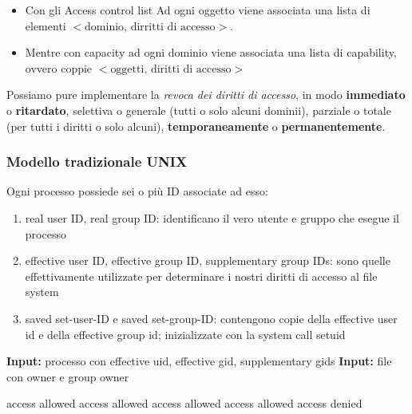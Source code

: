 \documentclass[a4paper,12pt]{article}
\begin{document}
\begin{itemize}
  \item Con gli Access control list Ad ogni oggetto viene associata una lista di elementi $<\text{dominio}, \, \text{dirritti di accesso}>$.\\
  \item Mentre con capacity ad ogni dominio viene associata una lista di capability, ovvero coppie $<\text{oggetti}, \, \text{diritti di accesso}>$
\end{itemize}
Possiamo pure implementare la \textit{revoca dei diritti di accesso}, in modo \textbf{immediato} o \textbf{ritardato}, selettiva o generale (tutti o solo alcuni dominii), parziale o totale (per tutti i diritti o solo alcuni), \textbf{temporaneamente} o \textbf{permanentemente}.
\subsubsection{Modello tradizionale UNIX}
Ogni processo possiede sei o più ID associate ad esso:
\begin{enumerate}
  \item real user ID, real group ID: identificano il vero utente e gruppo che esegue il processo
  \item effective user ID, effective group ID, supplementary group IDs: sono quelle effettivamente utilizzate per determinare i nostri
diritti di accesso al file system
  \item saved set-user-ID e saved set-group-ID: contengono copie della effective user id e della effective group
id; inizializzate con la system call setuid
\end{enumerate}
\begin{algorithm}
\caption{Modalità di accesso ad un file}
\begin{algorithmic}[1]

\State \textbf{Input:} processo con effective uid, effective gid, supplementary gids
\State \textbf{Input:} file con owner e group owner

    \State access allowed
    \State access allowed
    \State access allowed
    \State access allowed
\Else
    \State access denied
\EndIf

\end{algorithmic}
\end{algorithm}
\end{document}
